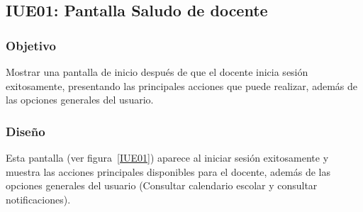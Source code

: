\subsection{IUE01: Pantalla Saludo de docente}

\newpage	

\subsubsection{Objetivo}
Mostrar una pantalla de inicio después de que el docente inicia sesión exitosamente, presentando las principales acciones que puede realizar, además de las opciones generales del usuario.

\subsubsection{Diseño}
Esta pantalla  (ver figura~\ref{IUE01}) aparece al iniciar sesión exitosamente y muestra las acciones principales disponibles para el docente, además de las opciones generales del usuario (Consultar calendario escolar y consultar notificaciones).



